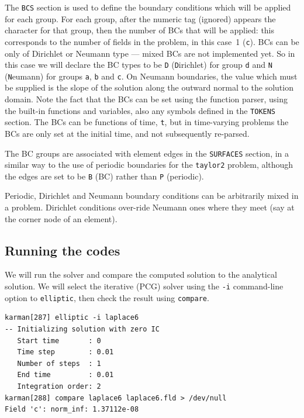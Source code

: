 \documentclass[11pt,a4paper]{report}
\begin{document}
The \texttt{BCS} section is used to define the boundary conditions
which will be applied for each group.  For each group, after the
numeric tag (ignored) appears the character for that group, then the
number of BCs that will be applied: this corresponds to the number of
fields in the problem, in this case~1 (\verb+c+).  BCs can be only of
Dirichlet or Neumann type --- mixed BCs are not implemented yet.  So
in this case we will declare the BC types to be \verb+D+ ({\texttt
D}irichlet) for group \verb+d+ and \verb+N+ ({\texttt N}eumann) for
groups \verb+a+, \verb+b+ and \verb+c+.  On Neumann boundaries, the
value which must be supplied is the slope of the solution along the
outward normal to the solution domain.  Note the fact that the BCs can
be set using the function parser, using the built-in functions and
variables, also any symbols defined in the \texttt{TOKENS} section.
The BCs can be functions of time, \verb+t+, but in time-varying
problems the BCs are only set at the initial time, and not
subsequently re-parsed.

The BC groups are associated with element edges in the \texttt{SURFACES}
section, in a similar way to the use of periodic boundaries for the
\texttt{taylor2} problem, although the edges are set to be \verb+B+ (BC)
rather than \verb+P+ (periodic).

Periodic, Dirichlet and Neumann boundary conditions can be arbitrarily
mixed in a problem.  Dirichlet conditions over-ride Neumann ones where
they meet (say at the corner node of an element).

\subsection{Running the codes}

We will run the solver and compare the computed solution to the
analytical solution.  We will select the iterative (PCG) solver using
the \verb+-i+ command-line option to \texttt{elliptic}, then check the 
result using \texttt{compare}.
{\small
\begin{verbatim}
karman[287] elliptic -i laplace6
-- Initializing solution with zero IC
   Start time       : 0
   Time step        : 0.01
   Number of steps  : 1
   End time         : 0.01
   Integration order: 2
karman[288] compare laplace6 laplace6.fld > /dev/null
Field 'c': norm_inf: 1.37112e-08
\end{verbatim}
}
\end{document}
